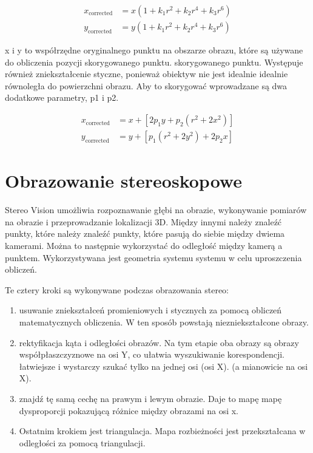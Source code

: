\documentclass[magisterska]{pracadypl}
\begin{document}
\begin{align*}
x_{\text{corrected}} &= x \left(1 + k_1 r^2 + k_2 r^4 + k_3 r^6 \right) \\
y_{\text{corrected}} &= y \left(1 + k_1 r^2 + k_2 r^4 + k_3 r^6 \right)
\end{align*}

x i y to współrzędne oryginalnego punktu na obszarze obrazu, które są używane do obliczenia pozycji skorygowanego punktu.
skorygowanego punktu.
Występuje również zniekształcenie styczne, ponieważ obiektyw nie jest idealnie
idealnie równoległa do powierzchni obrazu. Aby to skorygować
wprowadzane są dwa dodatkowe parametry, p1 i p2.

\begin{align*}
x_{\text{corrected}} &= x + \left[2p_1 y + p_2 (r^2 + 2x^2)\right] \\
y_{\text{corrected}} &= y + \left[p_1 (r^2 + 2y^2) + 2p_2 x\right]
\end{align*}


\section{Obrazowanie stereoskopowe}

Stereo Vision umożliwia rozpoznawanie głębi na obrazie, wykonywanie pomiarów na obrazie
i przeprowadzanie lokalizacji 3D. Między innymi należy znaleźć punkty, które
należy znaleźć punkty, które pasują do siebie między dwiema kamerami. Można to następnie wykorzystać do
odległość między kamerą a punktem. Wykorzystywana jest geometria systemu
systemu w celu uproszczenia obliczeń.

Te cztery kroki są wykonywane podczas obrazowania stereo:

\begin{enumerate}
  \item usuwanie zniekształceń promieniowych i stycznych za pomocą obliczeń matematycznych
obliczenia. W ten sposób powstają niezniekształcone obrazy.
  \item rektyfikacja kąta i odległości obrazów. Na tym etapie oba obrazy są
obrazy współpłaszczyznowe na osi Y, co ułatwia wyszukiwanie korespondencji.
łatwiejsze i wystarczy szukać tylko na jednej osi (osi X).
(a mianowicie na osi X).
  \item znajdź tę samą cechę na prawym i lewym obrazie. Daje to mapę
mapę dysproporcji pokazującą różnice między obrazami na osi x.
  \item Ostatnim krokiem jest triangulacja. Mapa rozbieżności jest przekształcana w
odległości za pomocą triangulacji.
\end{enumerate}
\end{document}
